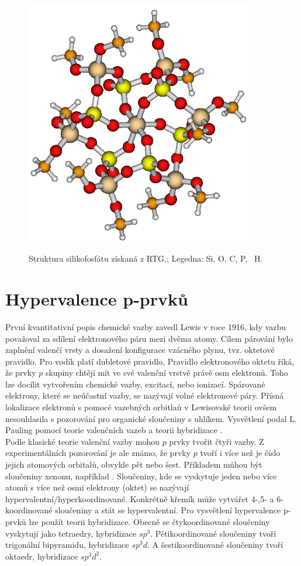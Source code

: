 \documentclass[
  digital, %
  table,   %
  lof,     %
  lot,     %
  oneside,
]{fithesis3}
\begin{document}
  \begin{figure}[h!]
  \caption{Struktura silikofosfátu získaná z RTG,\cite{C4TA06823H};  Legedna:  Si,  O,  C,  P, ~H. }
    \center
    \includegraphics[width=10cm]{struktura_puvodni.png}
    \label{rtg_koordinace_sest}
    \end{figure}

\section{Hypervalence p-prvků}
První kvantitativní popis chemické vazby zavedl Lewis v roce 1916, kdy vazbu považoval za sdílení elektronového páru mezi dvěma atomy. Cílem párování bylo zaplnění valenčí vrsty a dosažení konfigurace vzácného plynu, tvz. oktetové pravidlo. Pro vodík platí dubletové pravidlo, Pravidlo elektronového oktetu říká, že  prvky $p$ skupiny chtějí mít ve své valenční vrstvě právě osm elektronů. Toho lze docílit vytvořením chemické vazby, excitací, nebo ionizací. Spárované elektrony, které se neúčastní vazby, se nazývají volné elektronové páry. Přísná lokalizace elektronů s pomocé vazebných orbitlaů v Lewisovské teorii ovšem nesouhlasila s pozorování pro organické sloučeniny s uhlíkem. Vysvětlení podal L. Pauling pomocí teorie valenčních vazeb a teorii hybridizace \cite{Munzarova1996thesis}.\\

Podle klasické teorie valenční vazby mohou $p$ prvky tvořit čtyři vazby. Z experimentálních pozorování je ale známo, že prvky $p$  tvoří i více než je číslo jejich atomových orbitalů, obvykle pět nebo šest. Příkladem můhou být sloučeniny xenonu, například .
Sloučeniny, kde se vyskytuje jeden nebo více atomů s více než osmi elektrony (oktet) se nazývají hypervalentní/hyperkoordinované. Konkrétně křemík může vytvářet 4-,5- a 6- koordinované sloučeniny a stát se hypervalentní. Pro vysvětlení hypervalence p-prvků lze použít teorii hybridizace. Obecně se čtykoordinované sloučeniny vyskytují jako tetraedry, hybridizace $sp^3$. Pětikoordinované sloučeniny tvoří trigonální bipyramidu, hybridizace $sp^3d$. A šestikoordinované sloučeniny tvoří oktaedr, hybridizace $sp^3d^2$.\\
\end{document}

